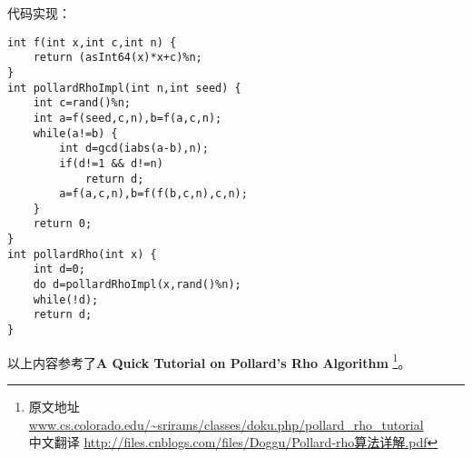 代码实现：
\begin{lstlisting}[title=Pollard Rho]
int f(int x,int c,int n) {
    return (asInt64(x)*x+c)%n;
}
int pollardRhoImpl(int n,int seed) {
    int c=rand()%n;
    int a=f(seed,c,n),b=f(a,c,n);
    while(a!=b) {
        int d=gcd(iabs(a-b),n);
        if(d!=1 && d!=n)
            return d;
        a=f(a,c,n),b=f(f(b,c,n),c,n);
    }
    return 0;
}
int pollardRho(int x) {
    int d=0;
    do d=pollardRhoImpl(x,rand()%n);
    while(!d);
    return d;
}
\end{lstlisting}

以上内容参考了{\bfseries A Quick Tutorial on Pollard's Rho Algorithm}
\footnote{原文地址
\url{www.cs.colorado.edu/~srirams/classes/doku.php/pollard\_rho\_tutorial}
\\中文翻译
\url{http://files.cnblogs.com/files/Doggu/Pollard-rho算法详解.pdf}
}。
